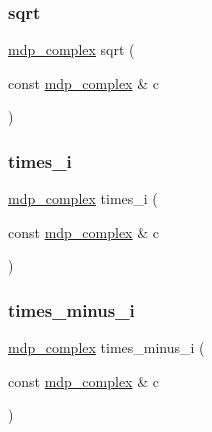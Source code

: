 \mbox{\label{classmdp__complex_ab967861ba5a992ba73f0aad6e6a80def}} 
\subsubsection{\texorpdfstring{sqrt}{sqrt}}
{\footnotesize\ttfamily \hyperlink{classmdp__complex}{mdp\+\_\+complex} sqrt (\begin{DoxyParamCaption}\item[{const \hyperlink{classmdp__complex}{mdp\+\_\+complex} \&}]{c }\end{DoxyParamCaption})\hspace{0.3cm}{\ttfamily [friend]}}

\mbox{\label{classmdp__complex_a4c38de484596ed698718b739631e4256}} 
\subsubsection{\texorpdfstring{times\+\_\+i}{times\_i}}
{\footnotesize\ttfamily \hyperlink{classmdp__complex}{mdp\+\_\+complex} times\+\_\+i (\begin{DoxyParamCaption}\item[{const \hyperlink{classmdp__complex}{mdp\+\_\+complex} \&}]{c }\end{DoxyParamCaption})\hspace{0.3cm}{\ttfamily [friend]}}

\mbox{\label{classmdp__complex_a0ccefb1f54f375c0f2e23c6f26ecdbbe}} 
\subsubsection{\texorpdfstring{times\+\_\+minus\+\_\+i}{times\_minus\_i}}
{\footnotesize\ttfamily \hyperlink{classmdp__complex}{mdp\+\_\+complex} times\+\_\+minus\+\_\+i (\begin{DoxyParamCaption}\item[{const \hyperlink{classmdp__complex}{mdp\+\_\+complex} \&}]{c }\end{DoxyParamCaption})\hspace{0.3cm}{\ttfamily [friend]}}



